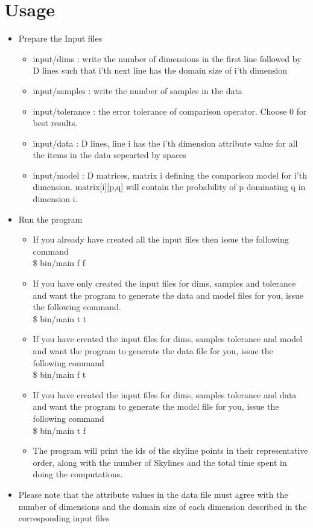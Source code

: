 \documentclass[twocolumn]{article}
\begin{document}
\section{Usage}
\begin{itemize}
    \item Prepare the Input files
    \begin{itemize}
        \item input/dims : write the number of dimensions in the first line followed by D lines such that i'th next line has the domain size of i'th dimension
        \item input/samples : write the number of samples in the data
        \item input/tolerance : the error tolerance of comparison operator. Choose 0 for best results.
        \item input/data : D lines, line i has the i'th dimension attribute value for all the items in the data sepearted by spaces
        \item input/model : D matrices, matrix i defining the comparison model for i'th dimension. matrix[i][p,q] will contain the probability of p dominating q in dimension i.
    \end{itemize}
    \item Run the program
    \begin{itemize}
        \item If you already have created all the input files then issue the following command \\
        \$ bin/main f f
        \item If you have only created the input files for dims, samples and tolerance and want the program to generate the data and model files for you, issue the following command. \\
        \$ bin/main t t
        \item If you have created the input files for dims, samples tolerance and model and want the program to generate the data file for you, issue the following command \\
        \$ bin/main f t
        \item If you have created the input files for dims, samples tolerance and data and want the program to generate the model file for you, issue the following command \\
        \$ bin/main t f
        \item The program will print the ids of the skyline points in their representative order, along with the number of Skylines and the total time spent in doing the computations.  
    \end{itemize}
    \item Please note that the attribute values in the data file must agree with the number of dimensions and the domain size of each dimension described in the corresponding input files
\end{itemize}
\end{document}
